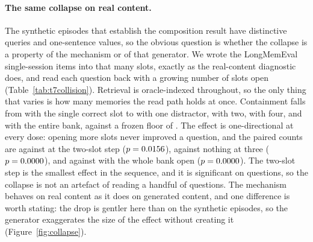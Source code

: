 \documentclass[11pt]{article}
\begin{document}
\paragraph{The same collapse on real content.} The synthetic episodes that establish the
composition result have distinctive queries and one-sentence values, so the obvious question
is whether the collapse is a property of the mechanism or of that generator. We wrote the
\tRealCollisionItems{} LongMemEval single-session items into that many slots, exactly as the
real-content diagnostic does, and read each question back with a growing number of slots
open (Table~\ref{tab:t7collision}). Retrieval is oracle-indexed throughout, so the only
thing that varies is how many memories the read path holds at once. Containment falls from
\tRealCollisionOne{} with the single correct slot to \tRealCollisionTwo{} with one
distractor, \tRealCollisionThree{} with two, \tRealCollisionFive{} with four, and
\tRealCollisionAll{} with the entire bank, against a frozen floor of
\tRealCollisionFloor{}. The effect is one-directional at every dose: opening more slots never
improved a question, and the paired counts are \tRealCollisionTwoHurt{} against
\tRealCollisionTwoHelped{} at the two-slot step ($p = 0.0156{}$),
\tRealCollisionThreeHurt{} against nothing at three ($p = 0.0000{}$), and
\tRealCollisionAllHurt{} against \tRealCollisionAllHelped{} with the whole bank open
($p = 0.0000{}$). The two-slot step is the smallest effect in the sequence, and
it is significant on \tRealCollisionItems{} questions, so the collapse is not an artefact of
reading a handful of questions. The mechanism behaves on real content as it does on
generated content, and one difference is worth stating: the drop is gentler here than on the
synthetic episodes, so the generator exaggerates the size of the effect without creating it
(Figure~\ref{fig:collapse}).


\end{document}
